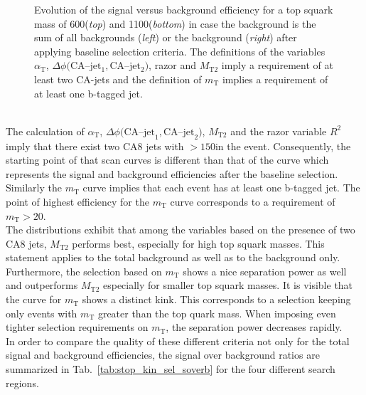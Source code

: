 \begin{figure}[!t]
{\begin{tabular}{cc}
  \end{tabular}}
  \caption{Evolution of the signal versus background efficiency for a top squark mass of 600\gev (\textit{top}) and 1100\gev (\textit{bottom}) in case the background is the sum of all backgrounds (\textit{left}) or the \ttbar background (\textit{right}) after applying baseline selection criteria. The definitions of the variables $\alpha_\mathrm{T}$, $\Delta \phi(\mathrm{CA}$--$\mathrm{jet_1, CA}$--$\mathrm{jet_2})$, razor and $M_\mathrm{T2}$ imply a requirement of at least two CA-jets and the definition of $m_\mathrm{T}$ implies a requirement of at least one b-tagged jet.}
  \label{fig:stop_baseline_cutscan_kin_vars}
\end{figure}
\\
The calculation of $\alpha_\mathrm{T}$, $\Delta \phi(\mathrm{CA}$--$\mathrm{jet}_1, \mathrm{CA}$--$\mathrm{jet}_2)$, $M_\mathrm{T2}$ and the razor variable $R^2$ imply that there exist two CA8 jets with \pt$> 150$\gev in the event. Consequently, the starting point of that scan curves is different than that of the \met curve which represents the signal and background efficiencies after the baseline selection. Similarly the $m_\mathrm{T}$ curve implies that each event has at least one b-tagged jet. The point of highest efficiency for the $m_\mathrm{T}$ curve corresponds to a requirement of $m_\mathrm{T} > 20$\gev.  \\
The distributions exhibit that among the variables based on the presence of two CA8 jets, $M_\mathrm{T2}$ performs best, especially for high top squark masses. This statement applies to the total background as well as to the \ttbar background only. Furthermore, the selection based on $m_\mathrm{T}$ shows a nice separation power as well and outperforms $M_\mathrm{T2}$ especially for smaller top squark masses. It is visible that the curve for $m_\mathrm{T}$ shows a distinct kink. This corresponds to a selection keeping only events with $m_\mathrm{T}$ greater than the top quark mass. When imposing even tighter selection requirements on $m_\mathrm{T}$, the separation power decreases rapidly. \\
In order to compare the quality of these different criteria not only for the total signal and background efficiencies, the signal over background ratios are summarized in Tab.~\ref{tab:stop_kin_sel_soverb} for the four different search regions. 
